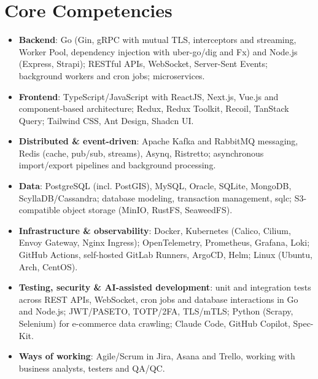 \documentclass[11pt,a4paper,sans]{moderncv}
\begin{document}
\section{Core Competencies}
\vspace{1pt}
\begin{itemize}

\item \textbf{Backend}: Go (Gin, gRPC with mutual TLS, interceptors and streaming, Worker Pool, dependency injection with uber-go/dig and Fx) and Node.js (Express, Strapi); RESTful APIs, WebSocket, Server-Sent Events; background workers and cron jobs; microservices.

\item \textbf{Frontend}: TypeScript/JavaScript with ReactJS, Next.js, Vue.js and component-based architecture; Redux, Redux Toolkit, Recoil, TanStack Query; Tailwind CSS, Ant Design, Shadcn UI.

\item \textbf{Distributed \& event-driven}: Apache Kafka and RabbitMQ messaging, Redis (cache, pub/sub, streams), Asynq, Ristretto; asynchronous import/export pipelines and background processing.

\item \textbf{Data}: PostgreSQL (incl. PostGIS), MySQL, Oracle, SQLite, MongoDB, ScyllaDB/Cassandra; database modeling, transaction management, sqlc; S3-compatible object storage (MinIO, RustFS, SeaweedFS).

\item \textbf{Infrastructure \& observability}: Docker, Kubernetes (Calico, Cilium, Envoy Gateway, Nginx Ingress); OpenTelemetry, Prometheus, Grafana, Loki; GitHub Actions, self-hosted GitLab Runners, ArgoCD, Helm; Linux (Ubuntu, Arch, CentOS).

\item \textbf{Testing, security \& AI-assisted development}: unit and integration tests across REST APIs, WebSocket, cron jobs and database interactions in Go and Node.js; JWT/PASETO, TOTP/2FA, TLS/mTLS; Python (Scrapy, Selenium) for e-commerce data crawling; Claude Code, GitHub Copilot, Spec-Kit.

\item \textbf{Ways of working}: Agile/Scrum in Jira, Asana and Trello, working with business analysts, testers and QA/QC.

\end{itemize}

\end{document}
